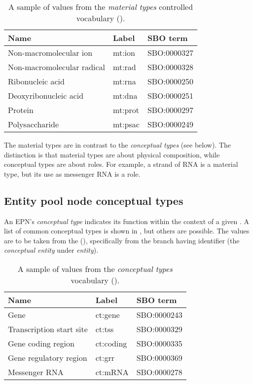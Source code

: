 \begin{table}[h]
  \centering
  \begin{tabular}{l>{\ttfamily}l>{\ttfamily}l}
    \toprule
    \textbf{Name}              & \textbf{\rmfamily Label} & \textbf{\rmfamily SBO term} \\
    \midrule
    Non-macromolecular ion     & mt:ion  & SBO:0000327\\
    Non-macromolecular radical & mt:rad  & SBO:0000328\\
    Ribonucleic acid           & mt:rna  & SBO:0000250\\
    Deoxyribonucleic acid       & mt:dna  & SBO:0000251\\
    Protein                    & mt:prot & SBO:0000297\\
    Polysaccharide             & mt:psac & SBO:0000249\\
    \bottomrule
  \end{tabular}
  \caption{A sample of values from the \emph{material types} controlled
    vocabulary ().}
  \label{tab:material-types-cv}
\end{table}

The material types are in contrast to the \emph{conceptual types} (see below).  The distinction is that material types are about physical composition, while conceptual types are about roles.  For example, a strand of RNA is a material type, but its use as messenger RNA is a role.

\subsection{Entity pool node conceptual types}
\label{sec:conceptual-types-cv}

An EPN's \emph{conceptual type} indicates its function within the context of a given \PD.  A list of common conceptual types is shown in , but others are possible.  The values are to be taken from the \sbo (\sbourl), specifically from the branch having identifier  (the \emph{conceptual entity} under \emph{entity}).  

\begin{table}[h]
  \centering
  \begin{tabular}{l>{\ttfamily}l>{\ttfamily}l}
    \toprule
    \textbf{Name}              & \textbf{\rmfamily Label} & \textbf{\rmfamily SBO term} \\
    \midrule
    Gene                      & ct:gene   & SBO:0000243\\
    Transcription start site  & ct:tss    & SBO:0000329\\
    Gene coding region        & ct:coding & SBO:0000335\\
    Gene regulatory region    & ct:grr    & SBO:0000369\\
    Messenger RNA             & ct:mRNA   & SBO:0000278\\
    \bottomrule
  \end{tabular}
  \caption{A sample of values from the \emph{conceptual types} vocabulary
    ().}
  \label{tab:conceptual-types-cv}
\end{table}

